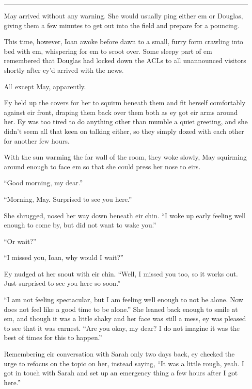\begin{center}\rule{0.5\linewidth}{0.5pt}\end{center}

May arrived without any warning. She would usually ping either em or Douglas, giving them a few minutes to get out into the field and prepare for a pouncing.

This time, however, Ioan awoke before dawn to a small, furry form crawling into bed with em, whispering for em to scoot over. Some sleepy part of em remembered that Douglas had locked down the ACLs to all unannounced visitors shortly after ey'd arrived with the news.

All except May, apparently.

Ey held up the covers for her to squirm beneath them and fit herself comfortably against eir front, draping them back over them both as ey got eir arms around her. Ey was too tired to do anything other than mumble a quiet greeting, and she didn't seem all that keen on talking either, so they simply dozed with each other for another few hours.

With the sun warming the far wall of the room, they woke slowly, May squirming around enough to face em so that she could press her nose to eirs.

``Good morning, my dear.''

``Morning, May. Surprised to see you here.''

She shrugged, nosed her way down beneath eir chin. ``I woke up early feeling well enough to come by, but did not want to wake you.''

``Or wait?''

``I missed you, Ioan, why would I wait?''

Ey nudged at her snout with eir chin. ``Well, I missed you too, so it works out. Just surprised to see you here so soon.''

``I am not feeling spectacular, but I am feeling well enough to not be alone. Now does not feel like a good time to be alone.'' She leaned back enough to smile at em, and though it was a little shaky and her face was still a mess, ey was pleased to see that it was earnest. ``Are you okay, my dear? I do not imagine it was the best of times for this to happen.''

Remembering eir conversation with Sarah only two days back, ey checked the urge to refocus on the topic on her, instead saying, ``It was a little rough, yeah. I got in touch with Sarah and set up an emergency thing a few hours after I got here.''

